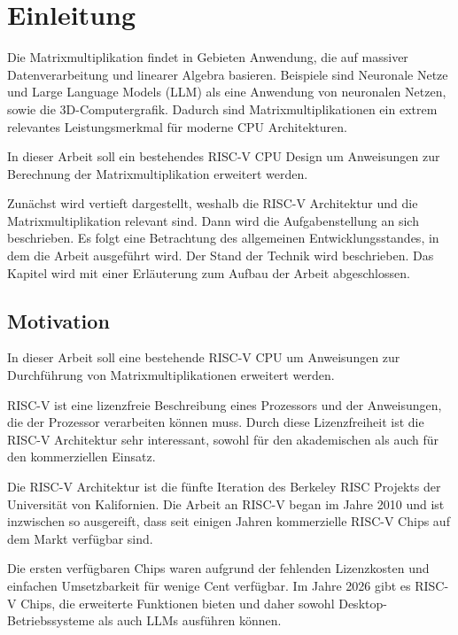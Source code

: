 \chapter{Einleitung} \label{chpt:Einleitung_Main}

Die Matrixmultiplikation findet in Gebieten Anwendung, die auf massiver Datenverarbeitung und linearer Algebra basieren. Beispiele sind Neuronale Netze und Large Language Models (\gls{LLM}) als eine Anwendung von neuronalen Netzen, sowie die 3D-Computergrafik. Dadurch sind Matrixmultiplikationen ein extrem relevantes Leistungsmerkmal für moderne CPU Architekturen.

In dieser Arbeit soll ein bestehendes RISC-V CPU Design um Anweisungen zur Berechnung der Matrixmultiplikation erweitert werden.

Zunächst wird vertieft dargestellt, weshalb die RISC-V Architektur und die Matrixmultiplikation relevant sind. Dann wird die Aufgabenstellung an sich beschrieben. Es folgt eine Betrachtung des allgemeinen Entwicklungsstandes, in dem die Arbeit ausgeführt wird. Der Stand der Technik wird beschrieben. Das Kapitel wird mit einer Erläuterung zum Aufbau der Arbeit abgeschlossen.




\section{Motivation} \label{sec:Einleitung_Motivation}

In dieser Arbeit soll eine bestehende RISC-V CPU um Anweisungen zur Durchführung von Matrixmultiplikationen erweitert werden.

RISC-V ist eine lizenzfreie Beschreibung eines Prozessors und der Anweisungen, die der Prozessor verarbeiten können muss. Durch diese Lizenzfreiheit ist die RISC-V Architektur sehr interessant, sowohl für den akademischen als auch für den kommerziellen Einsatz.

Die RISC-V Architektur ist die fünfte Iteration des Berkeley RISC Projekts der Universität von Kalifornien. Die Arbeit an RISC-V began im Jahre 2010 und ist inzwischen so ausgereift, dass seit einigen Jahren kommerzielle RISC-V Chips auf dem Markt verfügbar sind.

Die ersten verfügbaren Chips waren aufgrund der fehlenden Lizenzkosten und einfachen Umsetzbarkeit für wenige Cent verfügbar. Im Jahre 2026 gibt es RISC-V Chips, die erweiterte Funktionen bieten und daher sowohl Desktop-Betriebssysteme als auch LLMs ausführen können.

